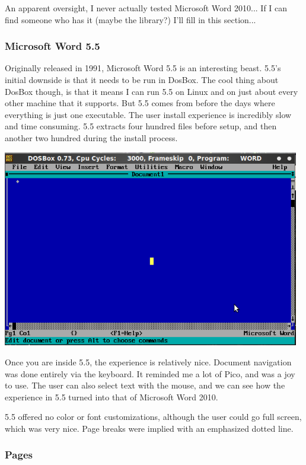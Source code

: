 \documentclass[11pt]{article}
\begin{document}
An apparent oversight, I never actually tested Microsoft Word 2010... If I can find someone who has it (maybe the library?) I'll fill in this section...

\subsubsection{Microsoft Word 5.5}

Originally released in 1991\cite{infoworld}, Microsoft Word 5.5 is an interesting beast. 5.5's initial downside is that it needs to be run in DosBox. The cool thing about DosBox though, is that it means I can run 5.5 on Linux and on just about every other machine that it supports. But 5.5 comes from before the days where everything is just one executable. The user install experience is incredibly slow and time consuming. 5.5 extracts four hundred files before setup, and then another two hundred during the install process.

\includegraphics[width=130mm]{images/w55_1.png}

Once you are inside 5.5, the experience is relatively nice. Document navigation was done entirely via the keyboard. It reminded me a lot of Pico, and was a joy to use. The user can also select text with the mouse, and we can see how the experience in 5.5 turned into that of Microsoft Word 2010.

5.5 offered no color or font customizations, although the user could go full screen, which was very nice. Page breaks were implied with an emphasized dotted line.

\subsubsection{Pages}
\end{document}
